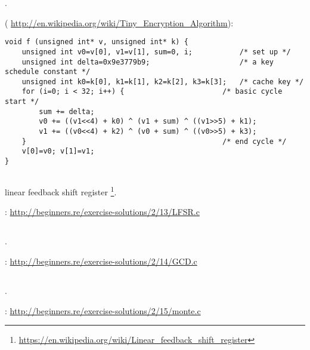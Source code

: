 .

 ( \url{http://en.wikipedia.org/wiki/Tiny_Encryption_Algorithm}):

\begin{lstlisting}
void f (unsigned int* v, unsigned int* k) {
    unsigned int v0=v[0], v1=v[1], sum=0, i;           /* set up */
    unsigned int delta=0x9e3779b9;                     /* a key schedule constant */
    unsigned int k0=k[0], k1=k[1], k2=k[2], k3=k[3];   /* cache key */
    for (i=0; i < 32; i++) {                       /* basic cycle start */
        sum += delta;
        v0 += ((v1<<4) + k0) ^ (v1 + sum) ^ ((v1>>5) + k1);
        v1 += ((v0<<4) + k2) ^ (v0 + sum) ^ ((v0>>5) + k3);  
    }                                              /* end cycle */
    v[0]=v0; v[1]=v1;
}
\end{lstlisting}


\subsection{}

linear feedback shift register
\footnote{\url{https://en.wikipedia.org/wiki/Linear_feedback_shift_register}}.

\Sourcecode: \url{http://beginners.re/exercise-solutions/2/13/LFSR.c}

\subsection{}

.

\Sourcecode: \url{http://beginners.re/exercise-solutions/2/14/GCD.c}

\subsection{}

.

\Sourcecode: \url{http://beginners.re/exercise-solutions/2/15/monte.c}

